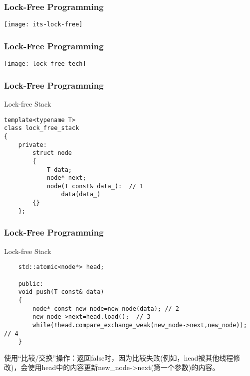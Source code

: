 \begin{frame}[fragile]
    \frametitle{Lock-Free Programming}
\texttt{[image: its-lock-free]}
    
\end{frame}

\begin{frame}[fragile]
    \frametitle{Lock-Free Programming}
    
   \centering 
   
    \texttt{[image: lock-free-tech]}
\end{frame}

\begin{frame}[fragile]
    \frametitle{Lock-Free Programming}
    \LARGE
    Lock-free Stack
    \normalsize    
    \begin{block}{}
        \begin{verbatim}
template<typename T>
class lock_free_stack
{
    private:
        struct node
        {
            T data;
            node* next;
            node(T const& data_):  // 1
                data(data_)
        {}
    };
\end{verbatim}
    \end{block}
    
\end{frame}


\begin{frame}[fragile]
    \frametitle{Lock-Free Programming}
    \LARGE
    Lock-free Stack
    \normalsize    
    \begin{block}{}
        \begin{verbatim}
    std::atomic<node*> head;
    
    public:
    void push(T const& data)
    {
        node* const new_node=new node(data); // 2
        new_node->next=head.load();  // 3
        while(!head.compare_exchange_weak(new_node->next,new_node));  // 4
    }
        \end{verbatim}
    \end{block}
    使用“比较/交换”操作：返回false时，因为比较失败(例如，head被其他线程修改)，会使用head中的内容更新new\_node->next(第一个参数)的内容。
\end{frame}

